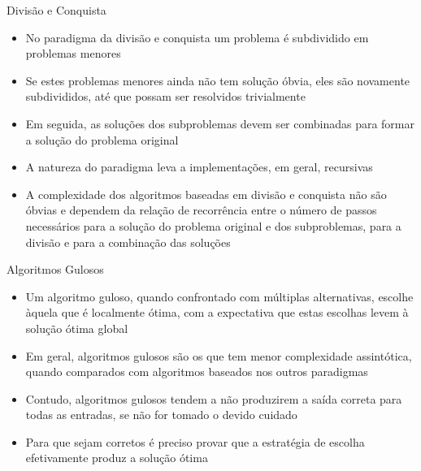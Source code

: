 \begin{frame}[fragile]{Divisão e Conquista}

    \begin{itemize}
        \item No paradigma da divisão e conquista um problema é subdividido em problemas menores

        \item Se estes problemas menores ainda não tem solução óbvia, eles são novamente
            subdivididos, até que possam ser resolvidos trivialmente

        \item Em seguida, as soluções dos subproblemas devem ser combinadas para formar a solução
            do problema original

        \item A natureza do paradigma leva a implementações, em geral, recursivas

        \item A complexidade dos algoritmos baseadas em divisão e conquista não são óbvias e 
            dependem da relação de recorrência entre o número de passos necessários para a solução
            do problema original e dos subproblemas, para a divisão e para a combinação das soluções
    \end{itemize}

\end{frame}

\begin{frame}[fragile]{Algoritmos Gulosos}

    \begin{itemize}
        \item Um algoritmo guloso, quando confrontado com múltiplas alternativas, escolhe àquela
            que é localmente ótima, com a expectativa que estas escolhas levem à solução ótima
            global

        \item Em geral, algoritmos gulosos são os que tem menor complexidade assintótica, quando
            comparados com algoritmos baseados nos outros paradigmas

        \item Contudo, algoritmos gulosos tendem a não produzirem a saída correta para todas as
            entradas, se não for tomado o devido cuidado

        \item Para que sejam corretos é preciso provar que a estratégia de escolha efetivamente
            produz a solução ótima
    \end{itemize}

\end{frame}

